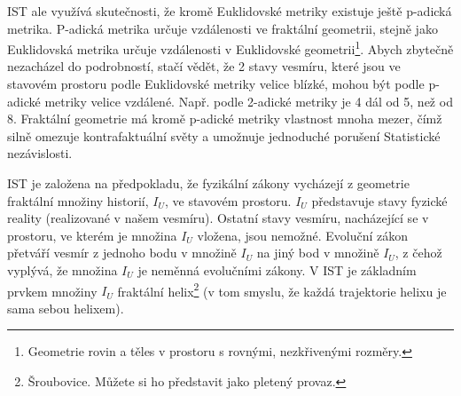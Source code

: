 IST ale využívá skutečnosti, že kromě Euklidovské metriky existuje ještě p-adická metrika. P-adická metrika určuje vzdálenosti ve fraktální geometrii, stejně jako Euklidovská metrika určuje vzdálenosti v Euklidovské geometrii\footnote[22]{Geometrie rovin a těles v prostoru s rovnými, nezkřivenými rozměry.}. Abych zbytečně nezacházel do podrobností, stačí vědět, že 2 stavy vesmíru, které jsou ve stavovém prostoru podle Euklidovské metriky velice blízké, mohou být podle p-adické metriky velice vzdálené. Např. podle 2-adické metriky je 4 dál od 5, než od 8. Fraktální geometrie má kromě p-adické metriky vlastnost mnoha mezer, čímž silně omezuje kontrafaktuální světy a umožnuje jednoduché porušení Statistické nezávislosti.

IST je založena na předpokladu, že fyzikální zákony vycházejí z geometrie fraktální množiny historií, $I_U$, ve stavovém prostoru. $I_U$ představuje stavy fyzické reality (realizované v našem vesmíru). Ostatní stavy vesmíru, nacházející se v prostoru, ve kterém je množina $I_U$ vložena, jsou nemožné. Evoluční zákon přetváří vesmír z jednoho bodu v množině $I_U$ na jiný bod v množině $I_U$, z čehož vyplývá, že množina $I_U$ je neměnná evolučními zákony. V IST je základním prvkem množiny $I_U$ fraktální helix\footnote[23]{Šroubovice. Můžete si ho představit jako pletený provaz.} (v tom smyslu, že každá trajektorie helixu je sama sebou helixem).

